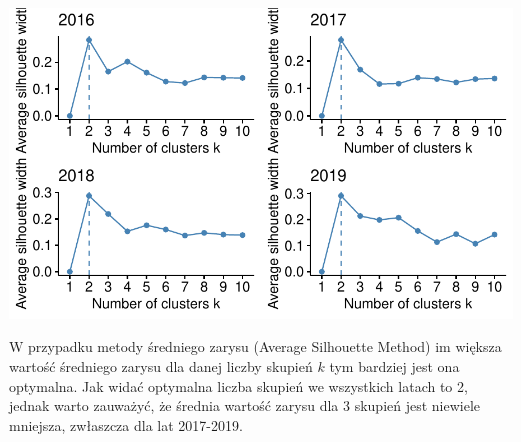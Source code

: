\documentclass{amuthesis}
\begin{document}
\begin{center}\includegraphics[width=1\linewidth]{figures/unnamed-chunk-10-1} \end{center}

W przypadku metody średniego zarysu (Average Silhouette Method) im większa wartość średniego zarysu dla danej liczby skupień \(k\) tym bardziej jest ona optymalna.
Jak widać optymalna liczba skupień we wszystkich latach to 2, jednak warto zauważyć, że średnia wartość zarysu dla 3 skupień jest niewiele mniejsza, zwłaszcza dla lat 2017-2019.

\begin{Shaded}
\begin{Highlighting}[]
\OtherTok{\textless{}{-}}\SpecialCharTok{::} \NormalTok{) }\SpecialCharTok{+}
\SpecialCharTok{::}\NormalTok{(}\NormalTok{)}
\OtherTok{\textless{}{-}}\SpecialCharTok{::} \NormalTok{) }\SpecialCharTok{+}
\SpecialCharTok{::}\NormalTok{(}\NormalTok{)}
\OtherTok{\textless{}{-}}\SpecialCharTok{::} \NormalTok{) }\SpecialCharTok{+}
\SpecialCharTok{::}\NormalTok{(}\NormalTok{)}
\OtherTok{\textless{}{-}}\SpecialCharTok{::} \NormalTok{) }\SpecialCharTok{+}
\SpecialCharTok{::}\NormalTok{(}\NormalTok{)}

\SpecialCharTok{::}
\end{Highlighting}
\end{Shaded}
\end{document}
